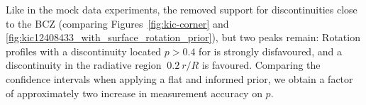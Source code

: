 





Like in the mock data experiments, the  removed support for discontinuities close to the BCZ (comparing Figures~\ref{fig:kic-corner} and \ref{fig:kic12408433_with_surface_rotation_prior}), but two peaks remain:   Rotation profiles with a discontinuity located $p>0.4$ for \thestar{} is strongly disfavoured, and a discontinuity in the radiative region $~0.2 \ r/R$ is favoured. Comparing the confidence intervals when applying a flat and informed prior, we obtain a factor of approximately two increase in measurement accuracy on $p$. %



